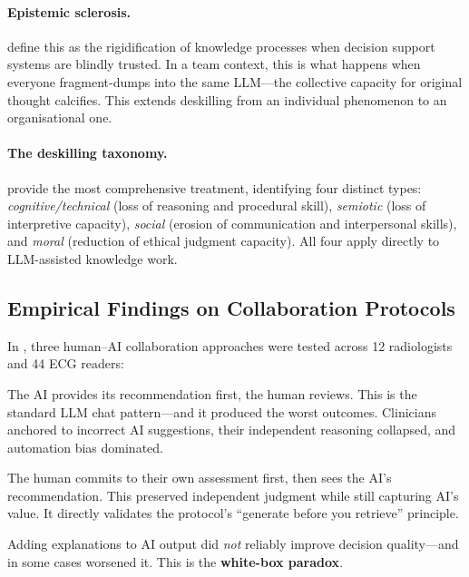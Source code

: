 \documentclass[11pt,a4paper]{article}
\begin{document}
\paragraph{Epistemic sclerosis.} \citet{natali2025frictional} define this as the
rigidification of knowledge processes when decision support systems are blindly
trusted. In a team context, this is what happens when everyone fragment-dumps
into the same LLM---the collective capacity for original thought calcifies. This
extends deskilling from an individual phenomenon to an organisational one.

\paragraph{The deskilling taxonomy.} \citet{natali2025taxonomy} provide the most
comprehensive treatment, identifying four distinct types:
\emph{cognitive/technical} (loss of reasoning and procedural skill),
\emph{semiotic} (loss of interpretive capacity), \emph{social} (erosion of
communication and interpersonal skills), and \emph{moral} (reduction of ethical
judgment capacity). All four apply directly to LLM-assisted knowledge work.

\subsection{Empirical Findings on Collaboration Protocols}

In \citet{cabitza2023rams}, three human--AI collaboration approaches were tested
across 12 radiologists and 44 ECG readers:

\begin{description}[style=nextline]
    \item[``Rams'' (AI-first)] The AI provides its recommendation first, the
    human reviews. This is the standard LLM chat pattern---and it produced the
    worst outcomes. Clinicians anchored to incorrect AI suggestions, their
    independent reasoning collapsed, and automation bias dominated.

    \item[``Hounds'' (human-first)] The human commits to their own assessment
    first, then sees the AI's recommendation. This preserved independent judgment
    while still capturing AI's value. It directly validates the protocol's
    ``generate before you retrieve'' principle.

    \item[``White Boxes'' (XAI-enhanced)] Adding explanations to AI output did
    \emph{not} reliably improve decision quality---and in some cases worsened it.
    This is the \textbf{white-box paradox}.
\end{description}
\end{document}
